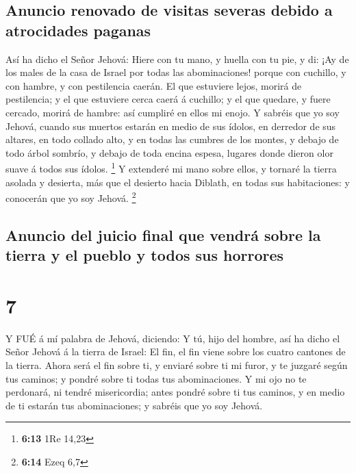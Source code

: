 \hypertarget{anuncio-renovado-de-visitas-severas-debido-a-atrocidades-paganas}{%
\subsection{Anuncio renovado de visitas severas debido a atrocidades
paganas}\label{anuncio-renovado-de-visitas-severas-debido-a-atrocidades-paganas}}

 Así ha dicho el Señor Jehová: Hiere con tu mano, y huella
con tu pie, y di: ¡Ay de los males de la casa de Israel por todas las
abominaciones! porque con cuchillo, y con hambre, y con pestilencia
caerán.  El que estuviere lejos, morirá de pestilencia; y
el que estuviere cerca caerá á cuchillo; y el que quedare, y fuere
cercado, morirá de hambre: así cumpliré en ellos mi enojo. 
Y sabréis que yo soy Jehová, cuando sus muertos estarán en medio de sus
ídolos, en derredor de sus altares, en todo collado alto, y en todas las
cumbres de los montes, y debajo de todo árbol sombrío, y debajo de toda
encina espesa, lugares donde dieron olor suave á todos sus ídolos.
\footnote{\textbf{6:13} 1Re 14,23}  Y extenderé mi mano
sobre ellos, y tornaré la tierra asolada y desierta, más que el desierto
hacia Diblath, en todas sus habitaciones: y conocerán que yo soy Jehová.
\footnote{\textbf{6:14} Ezeq 6,7}

\hypertarget{anuncio-del-juicio-final-que-vendruxe1-sobre-la-tierra-y-el-pueblo-y-todos-sus-horrores}{%
\subsection{Anuncio del juicio final que vendrá sobre la tierra y el
pueblo y todos sus
horrores}\label{anuncio-del-juicio-final-que-vendruxe1-sobre-la-tierra-y-el-pueblo-y-todos-sus-horrores}}

\hypertarget{section-6}{%
\section{7}\label{section-6}}

 Y FUÉ á mí palabra de Jehová, diciendo:  Y tú,
hijo del hombre, así ha dicho el Señor Jehová á la tierra de Israel: El
fin, el fin viene sobre los cuatro cantones de la tierra. 
Ahora será el fin sobre ti, y enviaré sobre ti mi furor, y te juzgaré
según tus caminos; y pondré sobre ti todas tus abominaciones.
 Y mi ojo no te perdonará, ni tendré misericordia; antes
pondré sobre ti tus caminos, y en medio de ti estarán tus abominaciones;
y sabréis que yo soy Jehová.

